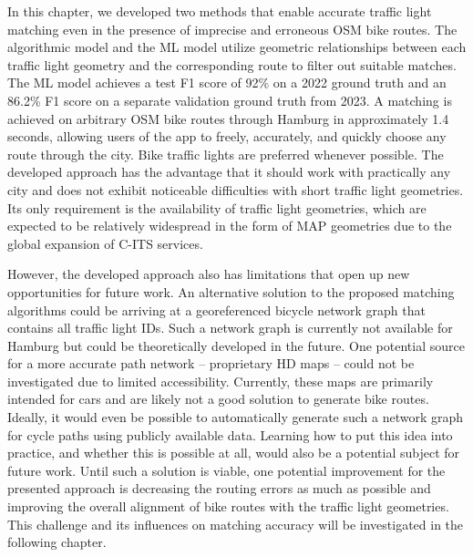 In this chapter, we developed two methods that enable accurate traffic light matching even in the presence of imprecise and erroneous OSM bike routes. The algorithmic model and the ML model utilize geometric relationships between each traffic light geometry and the corresponding route to filter out suitable matches. The ML model achieves a test F1 score of 92\% on a 2022 ground truth and an 86.2\% F1 score on a separate validation ground truth from 2023. A matching is achieved on arbitrary OSM bike routes through Hamburg in approximately 1.4 seconds, allowing users of the app to freely, accurately, and quickly choose any route through the city. Bike traffic lights are preferred whenever possible. The developed approach has the advantage that it should work with practically any city and does not exhibit noticeable difficulties with short traffic light geometries. Its only requirement is the availability of traffic light geometries, which are expected to be relatively widespread in the form of MAP geometries due to the global expansion of C-ITS services.

However, the developed approach also has limitations that open up new opportunities for future work. An alternative solution to the proposed matching algorithms could be arriving at a georeferenced bicycle network graph that contains all traffic light IDs. Such a network graph is currently not available for Hamburg \cite{neuner_leitfaden_2020} but could be theoretically developed in the future. One potential source for a more accurate path network -- proprietary HD maps -- could not be investigated due to limited accessibility. Currently, these maps are primarily intended for cars and are likely not a good solution to generate bike routes. Ideally, it would even be possible to automatically generate such a network graph for cycle paths using publicly available data. Learning how to put this idea into practice, and whether this is possible at all, would also be a potential subject for future work. Until such a solution is viable, one potential improvement for the presented approach is decreasing the routing errors as much as possible and improving the overall alignment of bike routes with the traffic light geometries. This challenge and its influences on matching accuracy will be investigated in the following chapter.